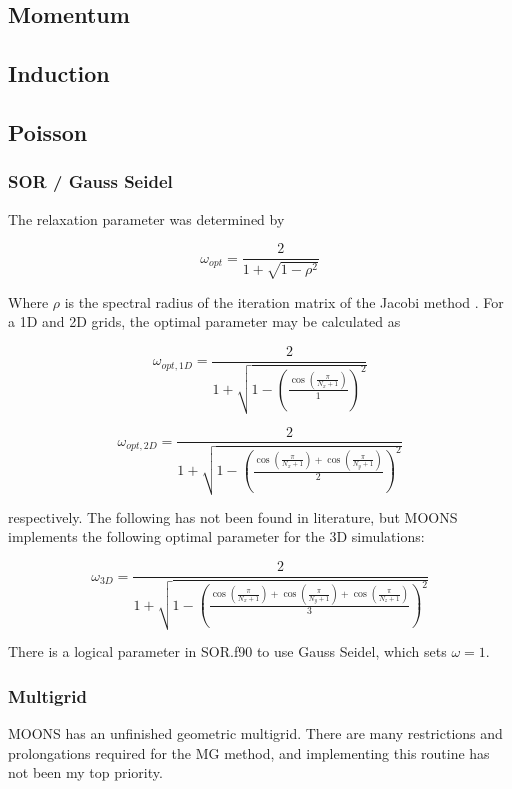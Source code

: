 \subsection{Momentum}
\subsection{Induction}
\subsection{Poisson}
\subsubsection{SOR / Gauss Seidel}
The relaxation parameter was determined by

\begin{equation} \label{eq:RelaxationParam}
\omega_{opt} = \frac{2}{1 + \sqrt{1 - \rho^2}}
\end{equation}

Where $\rho$ is the spectral radius of the iteration matrix of the Jacobi method \cite{Yang2009}. For a 1D and 2D grids, the optimal parameter may be calculated as \cite{Mcdonough2008}

\begin{equation}
\omega_{opt,1D} = \frac{2}{1 + \sqrt{1 - \left( \frac{\cos\left(\frac{\pi}{N_x+1} \right)}{1} \right)^2}}
\end{equation}

\begin{equation}
\omega_{opt,2D} = \frac{2}{1 + \sqrt{1 - \left( \frac{\cos\left(\frac{\pi}{N_x+1} \right) + \cos\left(\frac{\pi}{N_y+1} \right)}{2} \right)^2}}
\end{equation}

respectively. The following has not been found in literature, but MOONS implements the following optimal parameter for the 3D simulations:

\begin{equation}
\omega_{3D} = \frac{2}{1 + \sqrt{1 - \left( \frac{\cos\left(\frac{\pi}{N_x+1} \right) + \cos\left(\frac{\pi}{N_y+1} \right)+ \cos\left(\frac{\pi}{N_z+1} \right)}{3} \right)^2}}
\end{equation}

There is a logical parameter in SOR.f90 to use Gauss Seidel, which sets $\omega=1$.

\subsubsection{Multigrid}
MOONS has an unfinished geometric multigrid. There are many restrictions and prolongations required for the MG method, and implementing this routine has not been my top priority.

